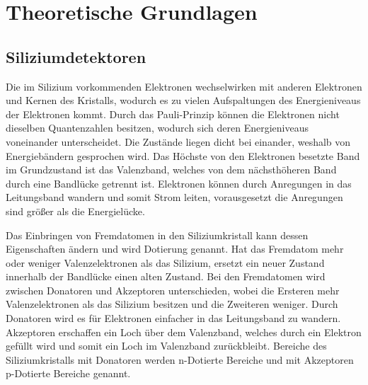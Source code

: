 \chapter{Theoretische Grundlagen}


\section{Siliziumdetektoren}

Die im Silizium vorkommenden Elektronen wechselwirken mit anderen Elektronen und
Kernen des Kristalls, wodurch es zu vielen Aufspaltungen des Energieniveaus der Elektronen kommt. Durch das Pauli-Prinzip können
die Elektronen nicht dieselben Quantenzahlen besitzen, wodurch sich deren Energieniveaus voneinander unterscheidet.
Die Zustände liegen dicht bei einander, weshalb von Energiebändern gesprochen wird.
Das Höchste von den Elektronen besetzte Band im Grundzustand ist das Valenzband, welches von dem
nächsthöheren Band durch eine Bandlücke getrennt ist. Elektronen können
durch Anregungen in das Leitungsband wandern und somit Strom leiten, vorausgesetzt
die Anregungen sind größer als die Energielücke.

Das Einbringen von Fremdatomen in den Siliziumkristall kann dessen Eigenschaften ändern
und wird Dotierung genannt.
Hat das Fremdatom mehr oder weniger Valenzelektronen als das Silizium, ersetzt ein neuer Zustand innerhalb der Bandlücke
einen alten Zustand.
Bei den Fremdatomen wird zwischen Donatoren und Akzeptoren unterschieden, wobei die
Ersteren mehr Valenzelektronen als das Silizium besitzen und die Zweiteren weniger.
Durch Donatoren wird es für Elektronen einfacher in das Leitungsband zu wandern. Akzeptoren
erschaffen ein Loch über dem Valenzband, welches durch ein Elektron gefüllt wird und somit ein
Loch im Valenzband zurückbleibt.
Bereiche des Siliziumkristalls mit Donatoren werden n-Dotierte Bereiche
und mit Akzeptoren p-Dotierte Bereiche genannt.


